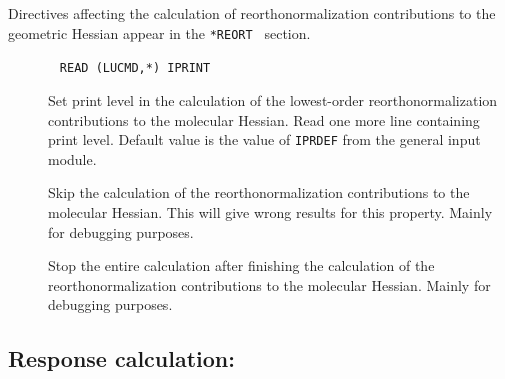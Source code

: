 Directives affecting the calculation of reorthonormalization
contributions to the geometric Hessian appear in the \verb|*REORT |
section. 
\begin{description}
\item[]\verb| |\newline
\verb|READ (LUCMD,*) IPRINT|

Set print level in the calculation of the lowest-order
reorthonormalization contributions to the molecular Hessian.  Read one
more line containing print level. Default value is the value of
\verb|IPRDEF| from the general input module.

\item[] Skip the calculation of the reorthonormalization
contributions to the molecular Hessian. This will give wrong results
for this property. Mainly for debugging purposes.

\item[] Stop the entire calculation after finishing the
calculation of the reorthonormalization contributions to the molecular
Hessian. Mainly for debugging purposes.
\end{description}

\subsection{Response calculation: }
\label{sec:abares}


